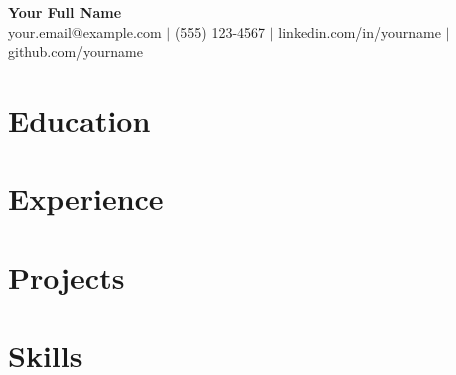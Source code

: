 \documentclass[11pt,a4paper]{article}
\begin{document}

\begin{center}
    {\LARGE\textbf{Your Full Name}} \\[3pt]
    your.email@example.com $\mid$
    (555) 123-4567 $\mid$
    linkedin.com/in/yourname $\mid$
    github.com/yourname
\end{center}

\section{Education}

\section{Experience}

\section{Projects}

\section{Skills}
\end{document}
